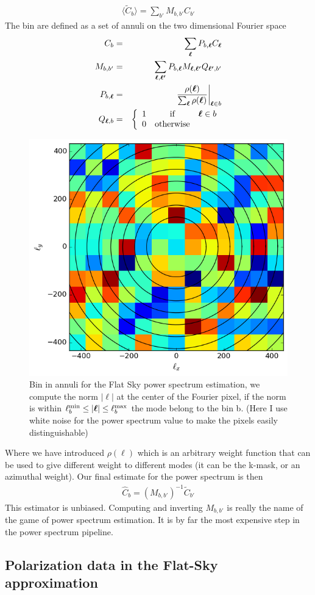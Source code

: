 \documentclass[a4paper, 11pt]{article}
\def\ba{\begin{eqnarray}}
\def\ea{\end{eqnarray}}
\begin{document}
\ba
\langle \tilde{C}_{b} \rangle= \sum_{b'} M_{b, b'}  C_{b'} 
\ea 
The bin are defined as a set of annuli on the two dimensional Fourier space
\ba
C_{b} &=&\sum_{\bm \ell} P_{b, \bm{\ell}} C_{\bm{\ell}} \\
M_{b, b'} &=& \sum_{\bm{\ell},\bm{\ell'}} P_{b, \bm{\ell}} M_{\bm{\ell}, \bm{\ell'}} Q_{\bm{\ell'}, b'} \\
P_{b, \bm{\ell}}  &=& \frac{\rho(\bm{\ell})}{\sum_{\bm{\ell}}\rho(\bm{\ell})} \bigg{|}_{\bm{\ell} \in b}\\
Q_{ \bm{\ell},b} &=& \left\{ \begin{array}{rcl} 1 & \mbox{if} &  \bm{\ell} \in b \\ 0 & \mbox{otherwise}
\end{array}\right. 
\ea

\begin{figure}
  \centering
  \includegraphics[width=0.5\columnwidth]{p2d.png}
  \caption{Bin in annuli for the Flat Sky power spectrum estimation, we compute the norm $|\bm{\ell}|$ at the center of the Fourier pixel, if the norm is within  $\ell^{\rm min}_{b} \leq |{\bm{\ell}| \leq \ell^{\rm max}_{b}}$  the mode belong to the bin b. (Here I use white noise for the power spectrum value to make the pixels easily distinguishable)}
  \label{fig:p2dbin}
\end{figure}



Where we have introduced $\rho(\bm{\ell})$ which is an arbitrary weight function that can be used to give different weight to different modes (it can be the k-mask, or an azimuthal weight).
Our final estimate for the power spectrum is then
\ba
\hat{C}_{b}= (M_{b, b'})^{-1} \tilde{C}_{b'} 
\ea
This estimator is unbiased. Computing and inverting $M_{b, b'}$ is really the name of the game of power spectrum estimation. It is by far the most expensive step in the power spectrum pipeline.

\subsection{Polarization data in the Flat-Sky approximation}
\end{document}
